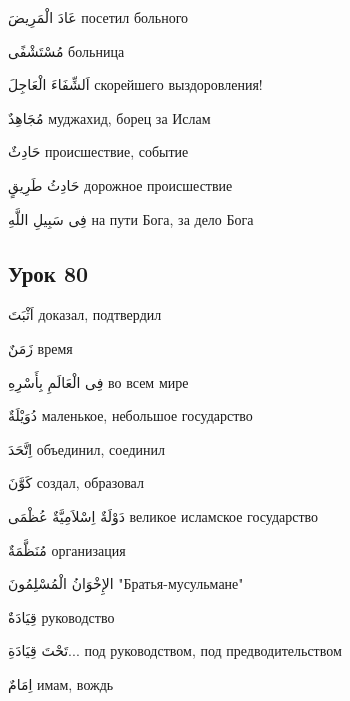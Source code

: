 \documentclass[a5paper]{article}
\newcommand\textstyleDropCaps[1]{#1}
\newcommand\textstyleCaptioncharacters[1]{#1}
\begin{document}
\textstyleCaptioncharacters{عَادَ الْمَرِيضَ }\textstyleDropCaps{посетил больного‎}

\textstyleCaptioncharacters{مُسْتَشْفًى }\textstyleDropCaps{больница‎}

\textstyleCaptioncharacters{اَلشِّفَاءَ الْعَاجِلَ }\textstyleDropCaps{ско­рейшего выздоровления!‎}

\textstyleCaptioncharacters{مُجَاهِدٌ }\textstyleDropCaps{муджахид, борец за Ислам‎}

\textstyleCaptioncharacters{حَادِثٌ }\textstyleDropCaps{происшествие, со­бытие‎}

\textstyleCaptioncharacters{حَادِثُ طَرِيقٍ }\textstyleDropCaps{дорож­ное происшествие‎}

\textstyleCaptioncharacters{فِى سَبِيلِ اللَّهِ }\textstyleDropCaps{на пути Бога, за дело Бога‎}

\subsection[Урок 80‎]{\textstyleDropCaps{Урок 80‎}}
\textstyleCaptioncharacters{اَثْبَتَ }\textstyleDropCaps{доказал, подтвердил‎}

\textstyleCaptioncharacters{زَمَنٌ }\textstyleDropCaps{время‎}

\textstyleCaptioncharacters{فِى الْعَالَمِ بِأَسْرِهِ }\textstyleDropCaps{во всем мире‎}

\textstyleCaptioncharacters{دُوَيْلَةٌ }\textstyleDropCaps{маленькое, не­большое государство‎}

\textstyleCaptioncharacters{اِتَّحَدَ }\textstyleDropCaps{объединил, соеди­нил‎}

\textstyleCaptioncharacters{كَوَّنَ }\textstyleDropCaps{создал, образовал‎}

\textstyleCaptioncharacters{دَوْلَةٌ اِسْلاَمِيَّةٌ عُظْمَى }\textstyleDropCaps{великое исламское государство‎}

\textstyleCaptioncharacters{مُنَظَّمَةٌ }\textstyleDropCaps{организация‎}

\textstyleCaptioncharacters{الإِخْوَانُ الْمُسْلِمُونَ }\textstyleDropCaps{"Братья-мусульмане"‎}

\textstyleCaptioncharacters{قِيَادَةٌ }\textstyleDropCaps{руководство‎}

\textstyleCaptioncharacters{تَحْتَ قِيَادَةِ...ِ }\textstyleDropCaps{под руко­водством, под предводительством‎}

\textstyleCaptioncharacters{اِمَامٌ }\textstyleDropCaps{имам, вождь‎}
\end{document}
